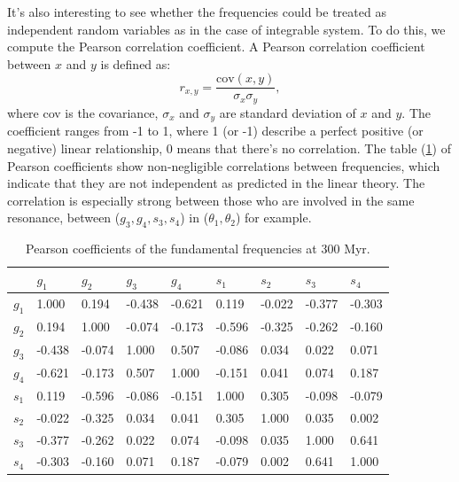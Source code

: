 \documentclass[12pt]{article}
\begin{document}
	It's also interesting to see whether the frequencies could be treated as independent random variables as in the case of integrable system. To do this, we compute the Pearson correlation coefficient. A Pearson correlation coefficient between $x$ and $y$ is defined as:
	\begin{equation}
	r_{x,y} = \frac{\text{cov}(x, y)}{\sigma_x \sigma_y},
	\end{equation}
	where cov is the covariance, $\sigma_x$ and $\sigma_y$ are standard deviation of $x$ and $y$. The coefficient ranges from -1 to 1, where 1 (or -1) describe a perfect positive (or negative) linear relationship, 0 means that there's no correlation.  The table (\ref{table:pearson}) of Pearson coefficients show non-negligible correlations between frequencies, which indicate that they are not independent as predicted in the linear theory. The correlation is especially strong between those who are involved in the same resonance, between ($g_3, g_4, s_3, s_4$) in ($\theta_1, \theta_2$) for example. 
	\begin{table}[ht]
		\centering
		\begin{tabular}{lllllllll}
			\toprule
			{} &   $g_1$ &   $g_2$ &   $g_3$ &   $g_4$ &   $s_1$ &   $s_2$ &   $s_3$ &   $s_4$ \\
			\midrule
			$g_1$ &   1.000 &   0.194 &  -0.438 &  -0.621 &   0.119 &  -0.022 &  -0.377 &  -0.303 \\
			$g_2$ &   0.194 &   1.000 &  -0.074 &  -0.173 &  -0.596 &  -0.325 &  -0.262 &  -0.160 \\
			$g_3$ &  -0.438 &  -0.074 &   1.000 &   0.507 &  -0.086 &   0.034 &   0.022 &   0.071 \\
			$g_4$ &  -0.621 &  -0.173 &   0.507 &   1.000 &  -0.151 &   0.041 &   0.074 &   0.187 \\
			$s_1$ &   0.119 &  -0.596 &  -0.086 &  -0.151 &   1.000 &   0.305 &  -0.098 &  -0.079 \\
			$s_2$ &  -0.022 &  -0.325 &   0.034 &   0.041 &   0.305 &   1.000 &   0.035 &   0.002 \\
			$s_3$ &  -0.377 &  -0.262 &   0.022 &   0.074 &  -0.098 &   0.035 &   1.000 &   0.641 \\
			$s_4$ &  -0.303 &  -0.160 &   0.071 &   0.187 &  -0.079 &   0.002 &   0.641 &   1.000 \\
			\bottomrule
		\end{tabular}
		\caption{Pearson coefficients of the fundamental frequencies at 300 Myr.}
		\label{table:pearson}
	\end{table}
	
\end{document}
